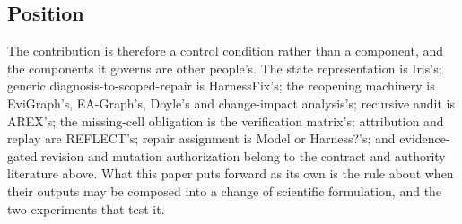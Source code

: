 \subsection{Position}

The contribution is therefore a control condition rather than a component, and
the components it governs are other people's. The state representation is
Iris's; generic diagnosis-to-scoped-repair is HarnessFix's; the reopening
machinery is EviGraph's, EA-Graph's, Doyle's and change-impact analysis's;
recursive audit is AREX's; the missing-cell obligation is the verification
matrix's; attribution and replay are REFLECT's; repair assignment is Model or
Harness?'s; and evidence-gated revision and mutation authorization belong to the
contract and authority literature above. What this paper puts forward as its own
is the rule about when their outputs may be composed into a change of scientific
formulation, and the two experiments that test it.
